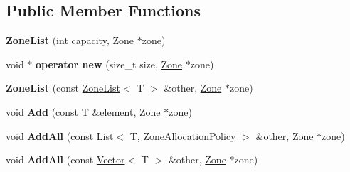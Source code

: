 \subsection*{Public Member Functions}
\begin{DoxyCompactItemize}
\item 
{\bfseries Zone\+List} (int capacity, \hyperlink{classv8_1_1internal_1_1_zone}{Zone} $\ast$zone)\hypertarget{classv8_1_1internal_1_1_zone_list_af1f7621b6c2be40916af5fc5a46ce517}{}\label{classv8_1_1internal_1_1_zone_list_af1f7621b6c2be40916af5fc5a46ce517}

\item 
void $\ast$ {\bfseries operator new} (size\+\_\+t size, \hyperlink{classv8_1_1internal_1_1_zone}{Zone} $\ast$zone)\hypertarget{classv8_1_1internal_1_1_zone_list_a957293196cdba1ac253cf42a7075bb7e}{}\label{classv8_1_1internal_1_1_zone_list_a957293196cdba1ac253cf42a7075bb7e}

\item 
{\bfseries Zone\+List} (const \hyperlink{classv8_1_1internal_1_1_zone_list}{Zone\+List}$<$ T $>$ \&other, \hyperlink{classv8_1_1internal_1_1_zone}{Zone} $\ast$zone)\hypertarget{classv8_1_1internal_1_1_zone_list_adebcf6abb4a1df45ad36a8dadc8be12b}{}\label{classv8_1_1internal_1_1_zone_list_adebcf6abb4a1df45ad36a8dadc8be12b}

\item 
void {\bfseries Add} (const T \&element, \hyperlink{classv8_1_1internal_1_1_zone}{Zone} $\ast$zone)\hypertarget{classv8_1_1internal_1_1_zone_list_aeab81ed4336f7c008d0f7b4d1dbec9ab}{}\label{classv8_1_1internal_1_1_zone_list_aeab81ed4336f7c008d0f7b4d1dbec9ab}

\item 
void {\bfseries Add\+All} (const \hyperlink{classv8_1_1internal_1_1_list}{List}$<$ T, \hyperlink{classv8_1_1internal_1_1_zone_allocation_policy}{Zone\+Allocation\+Policy} $>$ \&other, \hyperlink{classv8_1_1internal_1_1_zone}{Zone} $\ast$zone)\hypertarget{classv8_1_1internal_1_1_zone_list_a610996fa227a08fc6ca9e9ec75d1a2c2}{}\label{classv8_1_1internal_1_1_zone_list_a610996fa227a08fc6ca9e9ec75d1a2c2}

\item 
void {\bfseries Add\+All} (const \hyperlink{classv8_1_1internal_1_1_vector}{Vector}$<$ T $>$ \&other, \hyperlink{classv8_1_1internal_1_1_zone}{Zone} $\ast$zone)\hypertarget{classv8_1_1internal_1_1_zone_list_a27b3ed6a0f59815446a11caccbb06f18}{}\label{classv8_1_1internal_1_1_zone_list_a27b3ed6a0f59815446a11caccbb06f18}


\end{DoxyCompactItemize}
